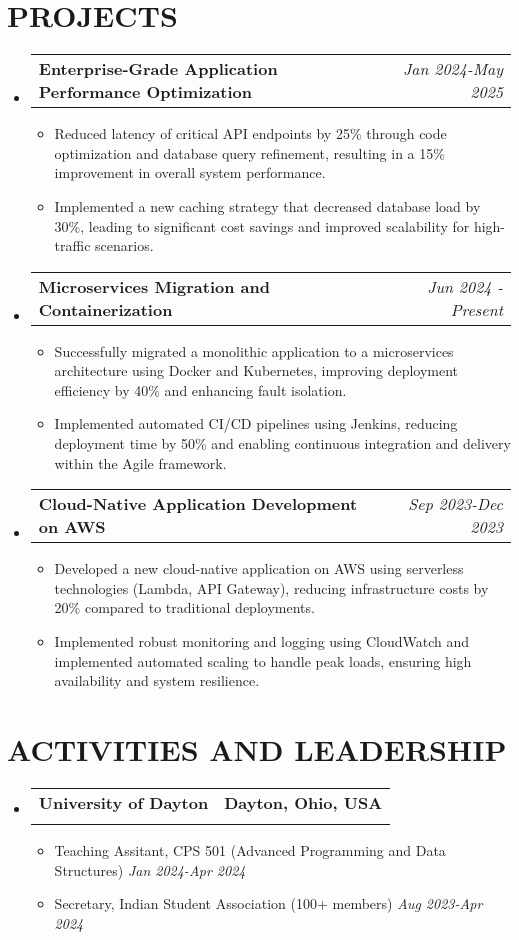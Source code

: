 \documentclass[letterpaper,11pt]{article}
\makeatletter
\newcommand{\resumeItem}[1]{\item\small{{#1 \vspace{-2pt}}}}
\newcommand{\resumeSubheading}[4]{\vspace{-2pt}\item\begin{tabular*}{0.97\textwidth}[t]{l@{\extracolsep{\fill}}r}\textbf{#1} & #2 \\\textit{\small#3} & \textit{\small #4} \\\end{tabular*}\vspace{-7pt}}
\newcommand{\resumeProjectHeading}[2]{\item\begin{tabular*}{0.97\textwidth}{l@{\extracolsep{\fill}}r}\small#1 & #2 \\\end{tabular*}\vspace{-7pt}}
\newcommand{\resumeSubHeadingListStart}{\begin{itemize}[leftmargin=0.15in, label={}]}
\newcommand{\resumeSubHeadingListEnd}{\end{itemize}}
\newcommand{\resumeItemListStart}{\begin{itemize}}
\newcommand{\resumeItemListEnd}{\end{itemize}\vspace{-5pt}}
\makeatother
\begin{document}
\section{{\fontsize{9pt}{20pt}\selectfont \textbf{PROJECTS}}}
\resumeSubHeadingListStart
\resumeProjectHeading{\textbf{Enterprise-Grade Application Performance Optimization}}{\textit{Jan 2024-May 2025}}
\resumeItemListStart
\resumeItem{Reduced latency of critical API endpoints by 25\% through code optimization and database query refinement, resulting in a 15\% improvement in overall system performance.}
\resumeItem{Implemented a new caching strategy that decreased database load by 30\%, leading to significant cost savings and improved scalability for high-traffic scenarios.}
\resumeItemListEnd\vspace{-6pt}
\resumeProjectHeading{\textbf{Microservices Migration and Containerization}}{\textit{Jun 2024 - Present}}
\resumeItemListStart
\resumeItem{Successfully migrated a monolithic application to a microservices architecture using Docker and Kubernetes, improving deployment efficiency by 40\% and enhancing fault isolation.}
\resumeItem{Implemented automated CI/CD pipelines using Jenkins, reducing deployment time by 50\% and enabling continuous integration and delivery within the Agile framework.}
\resumeItemListEnd\vspace{-6pt}
\resumeProjectHeading{\textbf{Cloud-Native Application Development on AWS}}{\textit{Sep 2023-Dec 2023}}
\resumeItemListStart
\resumeItem{Developed a new cloud-native application on AWS using serverless technologies (Lambda, API Gateway), reducing infrastructure costs by 20\% compared to traditional deployments.}
\resumeItem{Implemented robust monitoring and logging using CloudWatch and implemented automated scaling to handle peak loads, ensuring high availability and system resilience.}
\resumeItemListEnd
\resumeSubHeadingListEnd
\vspace{-17pt}

\section{{\fontsize{9pt}{20pt}\selectfont \textbf{ACTIVITIES AND LEADERSHIP}}}
\resumeSubHeadingListStart
\resumeSubheading{University of Dayton}{\textbf{Dayton, Ohio, USA}}{}{}
\vspace{-17pt}
\resumeItemListStart
\resumeItem{Teaching Assitant, CPS 501 (Advanced Programming and Data Structures)} \hfill \textit{Jan 2024-Apr 2024}
\resumeItem{Secretary, Indian Student Association (100+ members)} \hfill \textit{Aug 2023-Apr 2024}
\resumeItemListEnd
\resumeSubHeadingListEnd
\vspace{-18pt}
\end{document}
